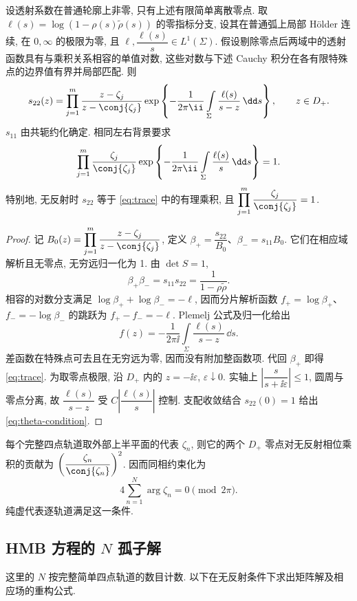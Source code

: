 \begin{proposition}[迹公式与同相约束]\label{prop:theta}
设透射系数在普通轮廓上非零, 只有上述有限简单离散零点. 取
$\ell(s)=\log(1-\rho(s)\widetilde\rho(s))$ 的零指标分支, 设其在普通弧上局部 Hölder 连续, 在 $0,\infty$ 的极限为零, 且 $\ell,\dfrac{\ell(s)}{s}\in L^1(\Sigma)$. 假设剔除零点后两域中的透射函数具有与乘积关系相容的单值对数, 这些对数与下述 Cauchy 积分在各有限特殊点的边界值有界并局部匹配. 则
\begin{equation}\label{eq:trace}
s_{22}(z)=\prod_{j=1}^{m}\dfrac{z-\zeta_j}{z-\conj{\zeta_j}}
\exp\left\{-\dfrac{1}{2\pi\ii}\int\limits_\Sigma\dfrac{\ell(s)}{s-z}\,\dd s\right\},\qquad z\in D_+.
\end{equation}
$s_{11}$ 由共轭约化确定. 相同左右背景要求
\begin{equation}\label{eq:theta-condition}
\prod_{j=1}^{m}\dfrac{\zeta_j}{\conj{\zeta_j}}
\exp\left\{-\dfrac{1}{2\pi\ii}\int\limits_\Sigma\dfrac{\ell(s)}{s}\,\dd s\right\}=1.
\end{equation}
特别地, 无反射时 $s_{22}$ 等于 \eqref{eq:trace} 中的有理乘积, 且 $\displaystyle\prod_{j=1}^{m}\dfrac{\zeta_j}{\conj{\zeta_j}}=1$.
\end{proposition}
\begin{proof}
记 $B_0(z)=\displaystyle\prod_{j=1}^{m}\dfrac{z-\zeta_j}{z-\conj{\zeta_j}}$, 定义
$\beta_+=\dfrac{s_{22}}{B_0}$、$\beta_-=s_{11}B_0$. 它们在相应域解析且无零点, 无穷远归一化为 1. 由 $\det S=1$,
\[
\beta_+\beta_-=s_{11}s_{22}=\dfrac{1}{1-\rho\widetilde\rho}.
\]
相容的对数分支满足 $\log\beta_++\log\beta_-=-\ell$, 因而分片解析函数 $f_+=\log\beta_+$、$f_-=-\log\beta_-$ 的跳跃为 $f_+-f_-=-\ell$. Plemelj 公式及归一化给出
\[
f(z)=-\dfrac{1}{2\pi\ii}\int\limits_\Sigma\dfrac{\ell(s)}{s-z}\,\dd s.
\]
差函数在特殊点可去且在无穷远为零, 因而没有附加整函数项. 代回 $\beta_+$ 即得 \eqref{eq:trace}. 为取零点极限, 沿 $D_+$ 内的 $z=-\ii\varepsilon$, $\varepsilon\downarrow0$. 实轴上 $\left|\dfrac{s}{s+\ii\varepsilon}\right|\le1$, 圆周与零点分离, 故 $\dfrac{\ell(s)}{s-z}$ 受 $C\left|\dfrac{\ell(s)}{s}\right|$ 控制. 支配收敛结合 $s_{22}(0)=1$ 给出 \eqref{eq:theta-condition}.
\end{proof}

每个完整四点轨道取外部上半平面的代表 $\zeta_n$, 则它的两个 $D_+$ 零点对无反射相位乘积的贡献为 $\left(\dfrac{\zeta_n}{\conj{\zeta_n}}\right)^2$. 因而同相约束化为
\[
4\sum\limits_{n=1}^{N}\arg\zeta_n=0\pmod{2\pi}.
\]
纯虚代表逐轨道满足这一条件.

\subsection{HMB 方程的 \texorpdfstring{$N$}{N} 孤子解}
这里的 $N$ 按完整简单四点轨道的数目计数. 以下在无反射条件下求出矩阵解及相应场的重构公式.

